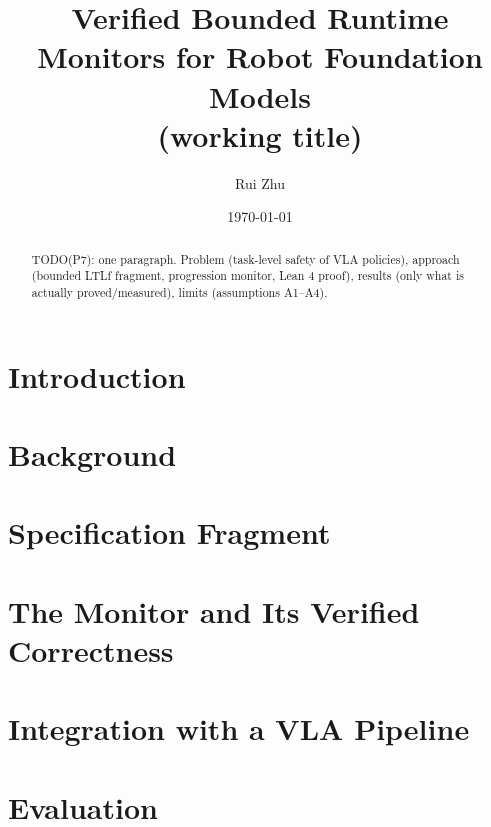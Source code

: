 \documentclass[11pt]{article}
\title{Verified Bounded Runtime Monitors for Robot Foundation Models\\
\large (working title)}
\author{Rui Zhu}  %
\date{\today}
\begin{document}
\maketitle

\begin{abstract}
TODO(P7): one paragraph. Problem (task-level safety of VLA policies), approach (bounded LTLf fragment,
progression monitor, Lean 4 proof), results (only what is actually proved/measured), limits (assumptions A1--A4).
\end{abstract}

\section{Introduction}

\section{Background}

\section{Specification Fragment}

\section{The Monitor and Its Verified Correctness}

\section{Integration with a VLA Pipeline}

\section{Evaluation}
\end{document}
